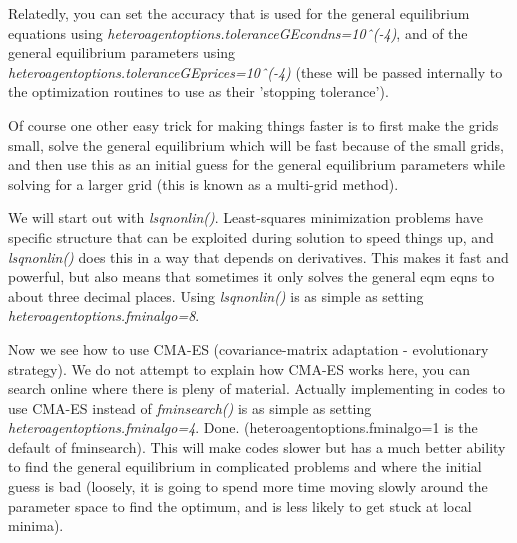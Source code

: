 Relatedly, you can set the accuracy that is used for the general equilibrium equations using \textit{heteroagentoptions.toleranceGEcondns=10ˆ(-4)}, and of the general equilibrium parameters using \textit{heteroagentoptions.toleranceGEprices=10ˆ(-4)} (these will be passed internally to the optimization routines to use as their 'stopping tolerance').

Of course one other easy trick for making things faster is to first make the grids small, solve the general equilibrium which will be fast because of the small grids, and then use this as an initial guess for the general equilibrium parameters while solving for a larger grid (this is known as a multi-grid method).

We will start out with \textit{lsqnonlin()}. Least-squares minimization problems have specific structure that can be exploited during solution to speed things up, and \textit{lsqnonlin()} does this in a way that depends on derivatives. This makes it fast and powerful, but also means that sometimes it only solves the general eqm eqns to about three decimal places. Using \textit{lsqnonlin()} is as simple as setting \textit{heteroagentoptions.fminalgo=8}.

Now we see how to use CMA-ES (covariance-matrix adaptation - evolutionary strategy). We do not attempt to explain how CMA-ES works here, you can search online where there is pleny of material. Actually implementing in codes to use CMA-ES instead of \textit{fminsearch()} is as simple as setting \textit{heteroagentoptions.fminalgo=4}. Done. (heteroagentoptions.fminalgo=1 is the default of fminsearch). This will make codes slower but has a much better ability to find the general equilibrium in complicated problems and where the initial guess is bad (loosely, it is going to spend more time moving slowly around the parameter space to find the optimum, and is less likely to get stuck at local minima).

